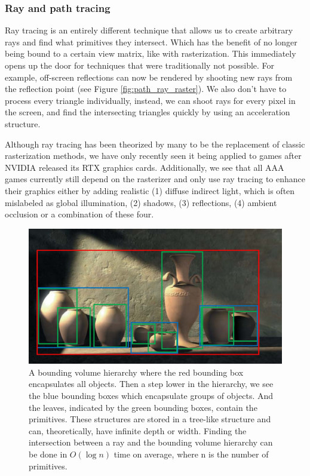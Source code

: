 \subsubsection{Ray and path tracing} \label{related_work:rendering:ray_tracing}
Ray tracing is an entirely different technique that allows us to create arbitrary rays and find what primitives they intersect. Which has the benefit of no longer being bound to a certain view matrix, like with rasterization. This immediately opens up the door for techniques that were traditionally not possible. For example, off-screen reflections can now be rendered by shooting new rays from the reflection point \cite{whitted1979improved} (see Figure \ref{fig:path_ray_raster}). We also don't have to process every triangle individually, instead, we can shoot rays for every pixel in the screen, and find the intersecting triangles quickly by using an acceleration structure.

Although ray tracing has been theorized by many to be the replacement of classic rasterization methods, we have only recently seen it being applied to games after NVIDIA released its RTX graphics cards. Additionally, we see that all AAA games currently still depend on the rasterizer and only use ray tracing to enhance their graphics either by adding realistic (1) diffuse indirect light, which is often mislabeled as global illumination, (2) shadows, (3) reflections, (4) ambient occlusion or a combination of these four\cite{NVIDIARTX}.
\begin{figure}[H]
    \centering
    \includegraphics[width=0.9\linewidth]{figures/bvh.jpg}
    \caption{A bounding volume hierarchy where the red bounding box encapsulates all objects. Then a step lower in the hierarchy, we see the blue bounding boxes which encapsulate groups of objects. And the leaves, indicated by the green bounding boxes, contain the primitives. These structures are stored in a tree-like structure and can, theoretically, have infinite depth or width. Finding the intersection between a ray and the bounding volume hierarchy can be done in $O(\log n)$ time on average, where n is the number of primitives. \cite{BVHJacco}}
    \label{fig:bvh}
\end{figure}

